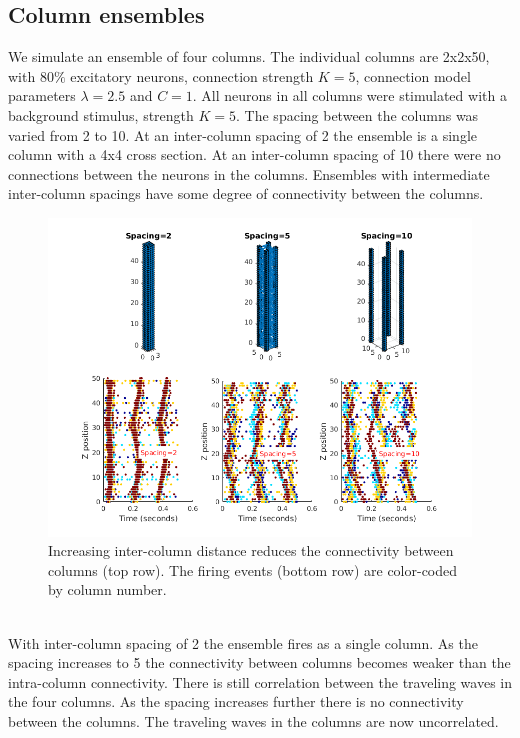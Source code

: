 \documentclass[a4paper,11pt]{article}
\begin{document}
\subsection{Column ensembles}
We simulate an ensemble of four columns. 
The individual columns are 2x2x50, with $80\%$ excitatory neurons, connection strength $K=5$, connection model parameters $\lambda=2.5$ and $C=1$.
All neurons in all columns were stimulated with a background stimulus, strength $K=5$.
The spacing between the columns was varied from 2 to 10. 
At an inter-column spacing of 2 the ensemble is a single column with a 4x4 cross section.
At an inter-column spacing of 10 there were no connections between the neurons in the columns.
Ensembles with intermediate inter-column spacings have some degree of connectivity between the columns.
\begin{figure}[!htb]
 \caption{Increasing inter-column distance reduces the connectivity between columns (top row). The firing events (bottom row) are color-coded by column number. }
 \label{fig:ensemble}
 \centering
   \includegraphics[width=\textwidth]{fig/ColumnEnsemble}
\end{figure}
\\
With inter-column spacing of 2 the ensemble fires as a single column.
As the spacing increases to 5 the connectivity between columns becomes weaker than the intra-column connectivity.
There is still correlation between the traveling waves in the four columns.
As the spacing increases further there is no connectivity between the columns.
The traveling waves in the columns are now uncorrelated.
\end{document}

